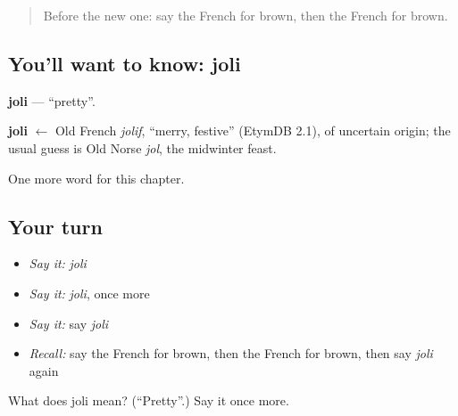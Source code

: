 \begin{quote}
Before the new one: say the French for brown, then the French for brown.
\end{quote}

\subsection*{You'll want to know: joli}
\textbf{joli} — \textquotedblleft{}pretty\textquotedblright{}.

\begin{cousinweb}
\textbf{joli} $\leftarrow$ Old French \emph{jolif}, \textquotedblleft{}merry, festive\textquotedblright{} (EtymDB 2.1), of uncertain origin; the usual guess is Old Norse \emph{jol}, the midwinter feast.
\end{cousinweb}

\begin{grammarlens}[title={What you've built}]
One more word for this chapter.
\end{grammarlens}

\subsection*{Your turn}
\begin{itemize}
\raggedright
  \item \emph{Say it:} \emph{joli}
  \item \emph{Say it:} \emph{joli}, once more
  \item \emph{Say it:} say \emph{joli}
  \item \emph{Recall:} say the French for brown, then the French for brown, then say \emph{joli} again
\end{itemize}

\begin{tcolorbox}[breakable,colback=teal!4,colframe=teal!35!black,title={Before you move on}]
What does joli mean? (\textquotedblleft{}Pretty\textquotedblright{}.) Say it once more.
\end{tcolorbox}
